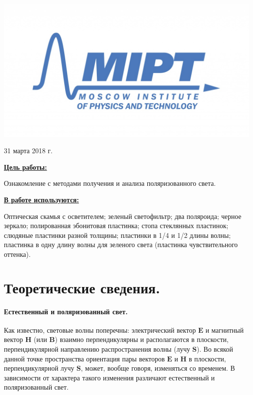\documentclass[a4paper, 12pt, twoside]{article}
\newenvironment{bottompar}{\par\vspace*{\fill}}{\clearpage}
\begin{document}
\begin{titlepage}
		\begin{bottompar}
			\begin{center}
				\includegraphics[width = 80 mm]{logo.jpg}
			\end{center}
			{\large 31 марта 2018 г.}
			
		\end{bottompar}
		\vfill %
		
	\end{titlepage}
	
	{\Large \uline { \textbf  {Цель работы:}}}
	
	\vspace{2mm}
	Ознакомление с методами получения и анализа поляризованного света.

	\vspace{\baselineskip}
	
	{\Large \uline { \textbf  {В работе используются:}}}
	
	\vspace{2mm}
	
	Оптическая скамья с осветителем; зеленый светофильтр; два поляроида; черное зеркало; полированная эбонитовая пластинка; стопа стеклянных пластинок; слюдяные пластинки разной толщины; пластинки в 1/4 и 1/2 длины волны; пластинка в одну длину волны для зеленого света (пластинка чувствительного оттенка).
	
	\section{Теоретические сведения.}
	
	\paragraph{Естественный и поляризованный свет.} 
	
	Как известно, световые волны поперечны: электрический вектор $\mathbf{E}$ и магнитный вектор $\mathbf{H}$ (или $\mathbf{B}$) взаимно перпендикулярны и располагаются в плоскости, перпендикулярной направлению распространения волны (лучу $\mathbf{S}$). Во всякой данной точке пространства ориентация пары векторов $\mathbf{E}$ и $\mathbf{H}$ в плоскости, перпендикулярной лучу $\mathbf{S}$, может, вообще говоря, изменяться со временем. В зависимости от характера такого изменения различают естественный и поляризованный свет.
	
\end{document}
